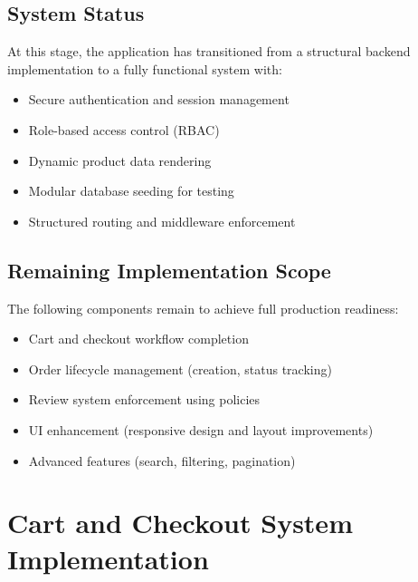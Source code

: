 \documentclass[12pt,a4paper]{article}
\begin{document}
\subsection{System Status}

At this stage, the application has transitioned from a structural backend implementation to a fully functional system with:

\begin{itemize}[noitemsep]
    \item Secure authentication and session management
    \item Role-based access control (RBAC)
    \item Dynamic product data rendering
    \item Modular database seeding for testing
    \item Structured routing and middleware enforcement
\end{itemize}

\subsection{Remaining Implementation Scope}

The following components remain to achieve full production readiness:

\begin{itemize}[noitemsep]
    \item Cart and checkout workflow completion
    \item Order lifecycle management (creation, status tracking)
    \item Review system enforcement using policies
    \item UI enhancement (responsive design and layout improvements)
    \item Advanced features (search, filtering, pagination)
\end{itemize}


\section{Cart and Checkout System Implementation}
\end{document}
